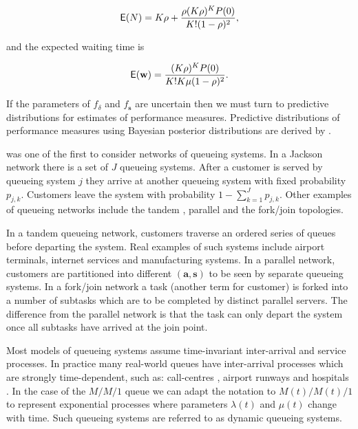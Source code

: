 \documentclass[article]{jss}
\begin{document}
\begin{align}
\mathsf{E}(N) = K\rho + \frac{\rho (K\rho)^K P(0)}{K!(1-\rho)^2},
\end{align}

and the expected waiting time is

\begin{align}
\mathsf{E}(\mathbf{w}) = \frac{(K \rho)^K P(0)}{K! K \mu(1-\rho)^2}.
\end{align}

If the parameters of $f_\delta$ and $f_{\mathbf{s}}$ are uncertain then we must turn to predictive distributions for estimates of performance measures. Predictive distributions of performance measures using Bayesian posterior distributions are derived by \citet{armero1994bayesian, armero1999dealing}.  

\citet{jackson_networks_1957} was one of the first to consider networks of queueing systems. In a Jackson network there is a set of $J$ queueing systems. After a customer is served by queueing system $j$ they arrive at another queueing system with fixed probability $p_{j,k}$. Customers leave the system with probability $1 - \sum_{k=1}^{J} p_{j,k}$. Other examples of queueing networks include the tandem \citep{glynn_departures_1991}, parallel \citep{hunt_fast_1995} and the fork/join \citep{kim_analysis_1989} topologies. 

In a tandem queueing network, customers traverse an ordered series of queues before departing the system. Real examples of such systems include airport terminals, internet services and manufacturing systems. In a parallel network, customers are partitioned into different $\mathbf{(a,s)}$ to be seen by separate queueing systems. In a fork/join network a task (another term for customer) is forked into a number of subtasks which are to be completed by distinct parallel servers. The difference from the parallel network is that the task can only depart the system once all subtasks have arrived at the join point. 

Most models of queueing systems assume time-invariant inter-arrival and service processes. In practice many real-world queues have inter-arrival processes which are strongly time-dependent, such as: call-centres \citep{weinberg2007bayesian, brown2005statistical}, airport runways \citep{koopman1972air} and hospitals \citep{brahimi_queueing_1991}. In the case of the $M/M/1$ queue we can adapt the notation to $M(t)/M(t)/1$ to represent exponential  processes where parameters $\lambda(t)$ and $\mu(t)$ change with time. Such queueing systems are referred to as dynamic queueing systems.  
\end{document}
